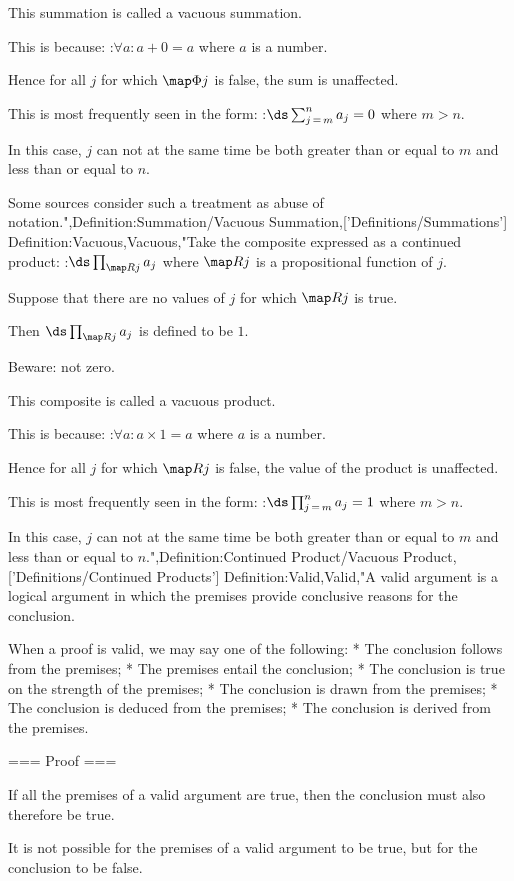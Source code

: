 This summation is called a vacuous summation.


This is because:
:$\forall a: a + 0 = a$
where $a$ is a number.

Hence for all $j$ for which $\map \Phi j$ is false, the sum is unaffected.


This is most frequently seen in the form:
:$\ds \sum_{j \mathop = m}^n a_j = 0$
where $m > n$.

In this case, $j$ can not at the same time be both greater than or equal to $m$ and less than or equal to $n$.


Some sources consider such a treatment as abuse of notation.",Definition:Summation/Vacuous Summation,['Definitions/Summations']
Definition:Vacuous,Vacuous,"Take the composite expressed as a continued product:
:$\ds \prod_{\map R j} a_j$
where $\map R j$ is a propositional function of $j$.

Suppose that there are no values of $j$ for which $\map R j$ is true.

Then $\ds \prod_{\map R j} a_j$ is defined to be $1$.

Beware: not zero.

This composite is called a vacuous product.


This is because:
:$\forall a: a \times 1 = a$
where $a$ is a number.

Hence for all $j$ for which $\map R j$ is false, the value of the product is unaffected.


This is most frequently seen in the form:
:$\ds \prod_{j \mathop = m}^n a_j = 1$
where $m > n$.

In this case, $j$ can not at the same time be both greater than or equal to $m$ and less than or equal to $n$.",Definition:Continued Product/Vacuous Product,['Definitions/Continued Products']
Definition:Valid,Valid,"A valid argument is a logical argument in which the premises provide conclusive reasons for the conclusion.


When a proof is valid, we may say one of the following:
* The conclusion follows from the premises;
* The premises entail the conclusion;
* The conclusion is true on the strength of the premises;
* The conclusion is drawn from the premises;
* The conclusion is deduced from the premises;
* The conclusion is derived from the premises.


=== Proof ===

If all the premises of a valid argument are true, then the conclusion must also therefore be true.

It is not possible for the premises of a valid argument to be true, but for the conclusion to be false.


